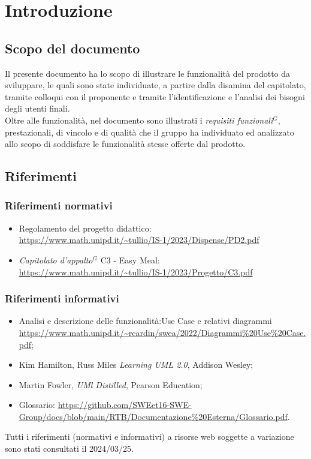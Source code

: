 \nonstopmode

\section{Introduzione}

\subsection{Scopo del documento}

Il presente documento ha lo scopo di illustrare le funzionalità del prodotto da sviluppare,
le quali sono state individuate, a partire dalla disamina del capitolato, tramite colloqui con
il proponente e tramite l'identificazione e l'analisi dei bisogni degli utenti finali.\\
Oltre alle funzionalità, nel documento sono illustrati i \emph{requisiti funzionali}$^{G}$, prestazionali, di
vincolo e di qualità che il gruppo ha individuato ed analizzato allo scopo di soddisfare le
funzionalità stesse offerte dal prodotto.

\subsection{Riferimenti}
\subsubsection{Riferimenti normativi}

\begin{itemize}
    \item Regolamento del progetto didattico: \\
    \url{https://www.math.unipd.it/~tullio/IS-1/2023/Dispense/PD2.pdf}
  \item \emph{Capitolato d’appalto}$^{G}$ C3 - Easy Meal: \\
    \url{https://www.math.unipd.it/~tullio/IS-1/2023/Progetto/C3.pdf}
\end{itemize}

\subsubsection{Riferimenti informativi}

\begin{itemize}
    \item Analisi e descrizione delle funzionalità:Use Case e relativi diagrammi \url{https://www.math.unipd.it/~rcardin/swea/2022/Diagrammi%20Use%20Case.pdf};
    \item Kim Hamilton, Russ Miles \emph{Learning UML 2.0}, Addison Wesley;
    \item Martin Fowler, \emph{UMl Distilled}, Pearson Education;
    \item Glossario: \url{https://github.com/SWEet16-SWE-Group/docs/blob/main/RTB/Documentazione%20Esterna/Glossario.pdf}.
\end{itemize}

Tutti i riferimenti (normativi e informativi) a risorse web soggette a variazione sono stati consultati il 2024/03/25.
